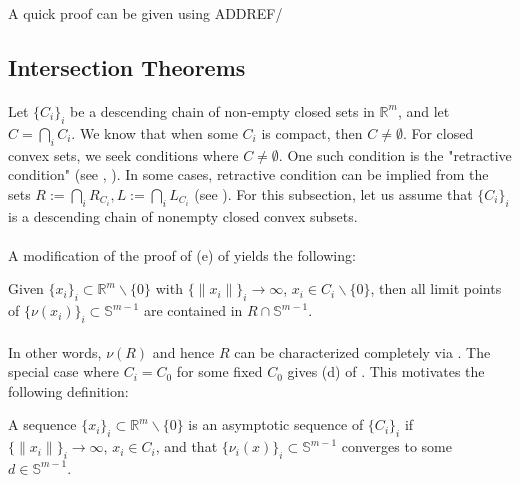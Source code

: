 \begin{rmrk}
	A quick proof can be given using ADDREF/
\end{rmrk}

\subsection{Intersection Theorems}

\paragraph{}Let $\{C_i\}_i$ be a descending chain of non-empty closed sets in $\mathbb{R}^m$, and let $C=\bigcap_iC_i$. We know that when some $C_i$ is compact, then $C\neq\emptyset$. For closed convex sets, we seek conditions where $C\neq\emptyset$. One such condition is the "retractive condition" (see , ). In some cases, retractive condition can be implied from the sets $R:=\bigcap_i R_{C_i},L:=\bigcap_i L_{C_i}$ (see ). For this subsection, let us assume that $\{C_i\}_i$ is a descending chain of nonempty closed convex subsets.
\paragraph{}A modification of the proof of (e) of  yields the following:

\begin{prop}
	\label{prop:014-construction-recession}
	Given $\{x_i\}_i\subset \mathbb{R}^m\smallsetminus \{0\}$ with $\{\|x_i\|\}_i\to\infty$, $x_i\in C_i\smallsetminus \{0\}$, then all limit points of $\{\nu(x_i)\}_i\subset \mathbb{S}^{m-1}$ are contained in $R\cap \mathbb{S}^{m-1}$.
\end{prop}

\paragraph{}In other words, $\nu(R)$ and hence $R$ can be characterized completely via . The special case where $C_i=C_0$ for some fixed $C_0$ gives (d) of . This motivates the following definition:

\begin{defn}
	\label{defn:014-asymptotic}
	A sequence $\{x_i\}_i\subset \mathbb{R}^m\smallsetminus\{0\}$ is an asymptotic sequence of $\{C_i\}_i$ if $\{\|x_i\|\}_i\to\infty$, $x_i\in C_i$, and that $\{\nu_i(x)\}_i\subset \mathbb{S}^{m-1}$ converges to some $d\in \mathbb{S}^{m-1}$.
\end{defn}

